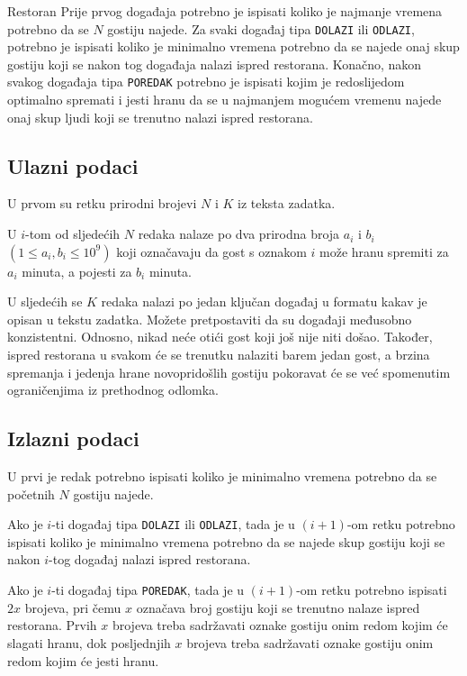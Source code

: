 \begin{statement}[
  problempoints=100,
  timelimit=1 sekunda,
  memorylimit=512 MiB,
]{Restoran}
Prije prvog događaja potrebno je ispisati koliko je najmanje vremena potrebno
da se $N$ gostiju najede. Za svaki događaj tipa \texttt{DOLAZI} ili
\texttt{ODLAZI}, potrebno je ispisati koliko je minimalno vremena potrebno da
se najede onaj skup gostiju koji se nakon tog događaja nalazi ispred
restorana. Konačno, nakon svakog događaja tipa \texttt{POREDAK} potrebno je
ispisati kojim je redoslijedom optimalno spremati i jesti hranu da se u
najmanjem mogućem vremenu najede onaj skup ljudi koji se trenutno nalazi
ispred restorana.

\subsection*{Ulazni podaci}
U prvom su retku prirodni brojevi $N$ i $K$ iz teksta zadatka.

U $i$-tom od sljedećih $N$ redaka nalaze po dva prirodna broja $a_i$ i $b_i$
$(1 \le a_i, b_i \le 10^9)$ koji označavaju da gost s oznakom $i$ može hranu
spremiti za $a_i$ minuta, a pojesti za $b_i$ minuta.

U sljedećih se $K$ redaka nalazi po jedan ključan događaj u formatu kakav
je opisan u tekstu zadatka. Možete pretpostaviti da su događaji međusobno
konzistentni. Odnosno, nikad neće otići gost koji još nije niti došao. Također,
ispred restorana u svakom će se trenutku nalaziti barem jedan gost, a brzina
spremanja i jedenja hrane novopridošlih gostiju pokoravat će se već spomenutim
ograničenjima iz prethodnog odlomka.

\clearpage
\subsection*{Izlazni podaci}
U prvi je redak potrebno ispisati koliko je minimalno vremena potrebno da se
početnih $N$ gostiju najede.

Ako je $i$-ti događaj tipa \texttt{DOLAZI} ili \texttt{ODLAZI}, tada je u
$(i+1)$-om retku potrebno ispisati koliko je minimalno vremena potrebno da se
najede skup gostiju koji se nakon $i$-tog događaj nalazi ispred restorana.

Ako je $i$-ti događaj tipa \texttt{POREDAK}, tada je u $(i+1)$-om retku potrebno
ispisati $2x$ brojeva, pri čemu $x$ označava broj gostiju koji se trenutno
nalaze ispred restorana. Prvih $x$ brojeva treba sadržavati oznake gostiju onim
redom kojim će slagati hranu, dok posljednjih $x$ brojeva treba sadržavati
oznake gostiju onim redom kojim će jesti hranu.


\end{statement}
